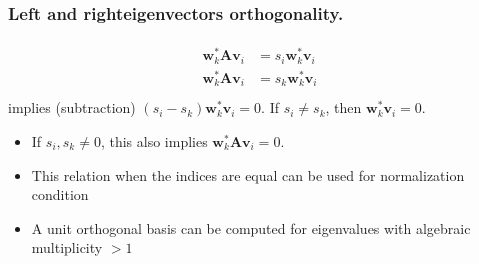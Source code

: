 \documentclass[letterpaper,10pt,english]{jupyterBook}
\begin{document}
\subsubsection*{Left\sphinxhyphen{} and right\sphinxhyphen{}eigenvectors orthogonality.}
\begin{equation*}
\begin{split}\begin{aligned}
  \mathbf{w}^*_k \mathbf{A} \mathbf{v}_i & = s_i \mathbf{w}^*_k \mathbf{v}_i \\
  \mathbf{w}^*_k \mathbf{A} \mathbf{v}_i & = s_k \mathbf{w}^*_k \mathbf{v}_i \\
\end{aligned}\end{split}
\end{equation*}
\sphinxAtStartPar
implies (subtraction) \((s_i - s_k) \mathbf{w}^*_k \mathbf{v}_i = 0\). If \(s_i \ne s_k\), then \(\mathbf{w}^*_k \mathbf{v}_i = 0\).
\begin{itemize}
\item {} 
\sphinxAtStartPar
If \(s_i, s_k \ne 0\), this also implies \(\mathbf{w}_k^* \mathbf{A} \mathbf{v}_i = 0\).

\item {} 
\sphinxAtStartPar
This relation when the indices are equal can be used for normalization condition

\item {} 
\sphinxAtStartPar
A unit orthogonal basis can be computed for eigenvalues with algebraic multiplicity \(> 1\)

\end{itemize}
\end{document}
